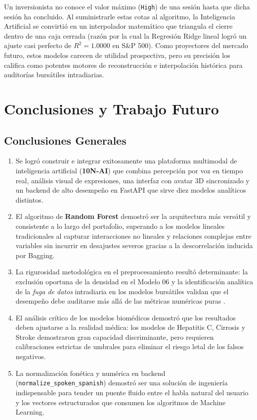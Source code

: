 \documentclass[12pt,letterpaper]{article}
\begin{document}
Un inversionista no conoce el valor máximo (\texttt{High}) de una sesión hasta que dicha sesión ha concluido. Al suministrarle estas cotas al algoritmo, la Inteligencia Artificial se convirtió en un interpolador matemático que triangula el cierre dentro de una caja cerrada (razón por la cual la Regresión Ridge lineal logró un ajuste casi perfecto de $R^2 = 1.0000$ en S\&P 500). Como proyectores del mercado futuro, estos modelos carecen de utilidad prospectiva, pero su precisión los califica como potentes motores de reconstrucción e interpolación histórica para auditorías bursátiles intradiarias.

\section{Conclusiones y Trabajo Futuro}

\subsection{Conclusiones Generales}
\begin{enumerate}[leftmargin=*]
    \item Se logró construir e integrar exitosamente una plataforma multimodal de inteligencia artificial (\textbf{10N-AI}) que combina percepción por voz en tiempo real, análisis visual de expresiones, una interfaz con avatar 3D sincronizado y un backend de alto desempeño en FastAPI que sirve diez modelos analíticos distintos.
    \item El algoritmo de \textbf{Random Forest} demostró ser la arquitectura más versátil y consistente a lo largo del portafolio, superando a los modelos lineales tradicionales al capturar interacciones no lineales y relaciones complejas entre variables sin incurrir en desajustes severos gracias a la descorrelación inducida por Bagging.
    \item La rigurosidad metodológica en el preprocesamiento resultó determinante: la exclusión oportuna de la densidad en el Modelo 06 y la identificación analítica de la \textit{fuga de datos} intradiaria en los modelos bursátiles validan que el desempeño debe auditarse más allá de las métricas numéricas puras \cite{kapoor2023leakage}.
    \item El análisis crítico de los modelos biomédicos demostró que los resultados deben ajustarse a la realidad médica: los modelos de Hepatitis C, Cirrosis y Stroke demostraron gran capacidad discriminante, pero requieren calibraciones estrictas de umbrales para eliminar el riesgo letal de los falsos negativos.
    \item La normalización fonética y numérica en backend (\texttt{normalize\_spoken\_spanish}) demostró ser una solución de ingeniería indispensable para tender un puente fluido entre el habla natural del usuario y los vectores estructurados que consumen los algoritmos de Machine Learning.
\end{enumerate}
\end{document}
